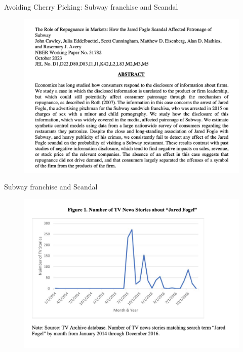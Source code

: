 \documentclass{beamer}
\begin{document}
\begin{frame}{Avoiding Cherry Picking: Subway franchise and Scandal}

	\begin{figure}
	\includegraphics[scale=0.25]{./lecture_includes/subway_8.png}
	\end{figure}

\end{frame}

\begin{frame}{Subway franchise and Scandal}

	\begin{figure}
	\includegraphics[scale=0.25]{./lecture_includes/subway_1.png}
	\end{figure}

\end{frame}
\end{document}
